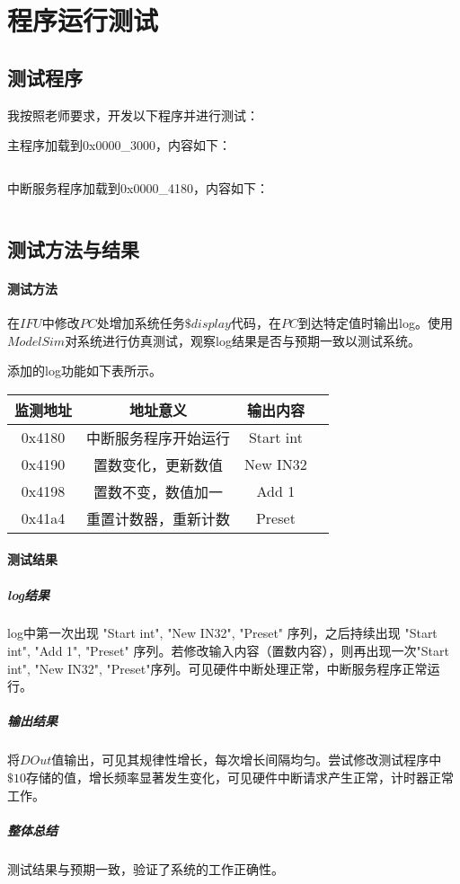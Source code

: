 \documentclass[main.tex]{subfiles}
\begin{document}
\section{程序运行测试}

\subsection{测试程序}
我按照老师要求，开发以下程序并进行测试：

主程序加载到0x0000\_3000，内容如下：
\inputminted[linenos]{gas}{Project3/p3-test-main-commented.asm}

中断服务程序加载到0x0000\_4180，内容如下：
\inputminted[linenos]{gas}{Project3/p3-test-int-commented.asm}

\clearpage

\subsection{测试方法与结果}

\paragraph{测试方法}
在$IFU$中修改$PC$处增加系统任务$\$display$代码，在$PC$到达特定值时输出log。使用$ModelSim$对系统进行仿真测试，观察log结果是否与预期一致以测试系统。

添加的log功能如下表所示。

\begin{center}
    \begin{longtable}[]{c c c c}
        \toprule
        监测地址 & 地址意义 & 输出内容 \\
        \midrule
        0x4180 & 中断服务程序开始运行 & Start int \\
        0x4190 & 置数变化，更新数值 & New IN32 \\
        0x4198 & 置数不变，数值加一 & Add 1 \\
        0x41a4 & 重置计数器，重新计数 & Preset \\
        \bottomrule
    \end{longtable}
\end{center}

\paragraph{测试结果}

\subparagraph{log结果} log中第一次出现 "Start int", "New IN32", "Preset" 序列，之后持续出现 "Start int", "Add 1", "Preset" 序列。若修改输入内容（置数内容），则再出现一次"Start int", "New IN32", "Preset"序列。可见硬件中断处理正常，中断服务程序正常运行。

\subparagraph{输出结果} 将$DOut$值输出，可见其规律性增长，每次增长间隔均匀。尝试修改测试程序中$\$10$存储的值，增长频率显著发生变化，可见硬件中断请求产生正常，计时器正常工作。

\subparagraph{整体总结} 测试结果与预期一致，验证了系统的工作正确性。
\end{document}
